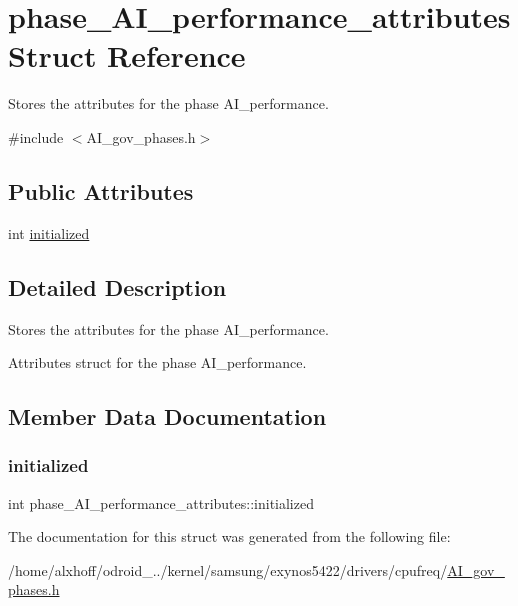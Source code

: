 \hypertarget{structphase__AI__performance__attributes}{}\section{phase\+\_\+\+A\+I\+\_\+performance\+\_\+attributes Struct Reference}
\label{structphase__AI__performance__attributes}


Stores the attributes for the phase A\+I\+\_\+performance.  




{\ttfamily \#include $<$A\+I\+\_\+gov\+\_\+phases.\+h$>$}

\subsection*{Public Attributes}
\begin{DoxyCompactItemize}
\item 
int \hyperlink{structphase__AI__performance__attributes_aba9be00eda0cb18473953ada1e754d64}{initialized}
\end{DoxyCompactItemize}


\subsection{Detailed Description}
Stores the attributes for the phase A\+I\+\_\+performance. 

Attributes struct for the phase A\+I\+\_\+performance. 

\subsection{Member Data Documentation}
\mbox{\label{structphase__AI__performance__attributes_aba9be00eda0cb18473953ada1e754d64}} 
\subsubsection{\texorpdfstring{initialized}{initialized}}
{\footnotesize\ttfamily int phase\+\_\+\+A\+I\+\_\+performance\+\_\+attributes\+::initialized}



The documentation for this struct was generated from the following file\+:\begin{DoxyCompactItemize}
\item 
/home/alxhoff/odroid\+\_../kernel/samsung/exynos5422/drivers/cpufreq/\hyperlink{AI__gov__phases_8h}{A\+I\+\_\+gov\+\_\+phases.\+h}\end{DoxyCompactItemize}
